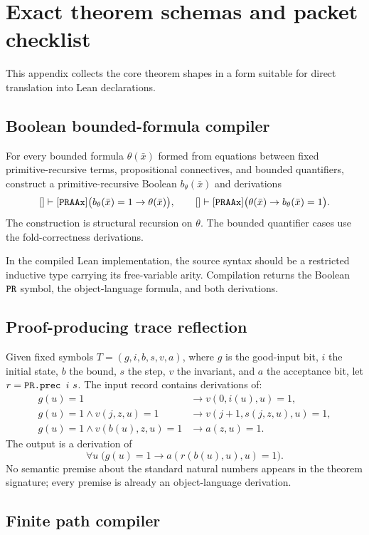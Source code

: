 \appendix
\section{Exact theorem schemas and packet checklist}
\label{app:schemas}

This appendix collects the core theorem shapes in a form suitable for direct
translation into Lean declarations.

\subsection{Boolean bounded-formula compiler}

For every bounded formula \(\theta(\bar x)\) formed from equations between
fixed primitive-recursive terms, propositional connectives, and bounded
quantifiers, construct a primitive-recursive Boolean
\(b_\theta(\bar x)\) and derivations
\[
 []\vdash[\texttt{PRAAx}]
 \bigl(b_\theta(\bar x)=1\to\theta(\bar x)\bigr),
 \qquad
 []\vdash[\texttt{PRAAx}]
 \bigl(\theta(\bar x)\to b_\theta(\bar x)=1\bigr).
\]
The construction is structural recursion on \(\theta\).  The bounded
quantifier cases use the fold-correctness derivations.

In the compiled Lean implementation, the source syntax should be a restricted
inductive type carrying its free-variable arity.  Compilation returns the
Boolean \(\texttt{PR}\) symbol, the object-language formula, and both derivations.

\subsection{Proof-producing trace reflection}

Given fixed symbols \(T=(g,i,b,s,v,a)\), where \(g\) is the good-input bit,
\(i\) the initial state, \(b\) the bound, \(s\) the step, \(v\) the invariant,
and \(a\) the acceptance bit, let \(r=\code{PR.prec }i\ s\).  The input record
contains derivations of:
\begin{align*}
 g(u)=1&\to v(0,i(u),u)=1,\\
 g(u)=1\wedge v(j,z,u)=1&\to v(j+1,s(j,z,u),u)=1,\\
 g(u)=1\wedge v(b(u),z,u)=1&\to a(z,u)=1.
\end{align*}
The output is a derivation of
\[
 \forall u\;\bigl(g(u)=1\to a(r(b(u),u),u)=1\bigr).
\]
No semantic premise about the standard natural numbers appears in the theorem
signature; every premise is already an object-language derivation.

\subsection{Finite path compiler}

